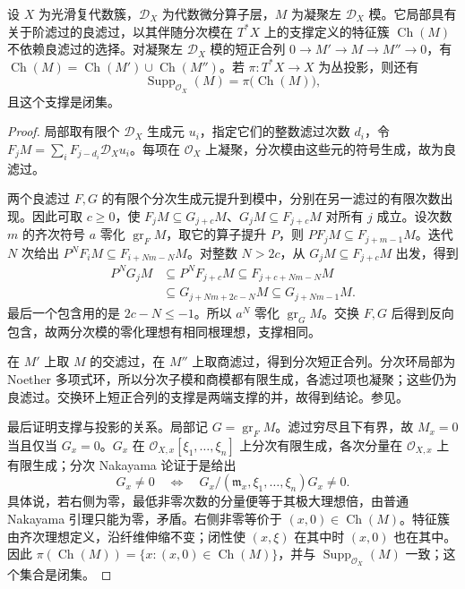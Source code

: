 \begin{proposition}[良滤过与特征簇]\label{b5:prop:D-good-filtration-invariance}
	设 \(X\) 为光滑复代数簇，\(\mathcal D_X\) 为代数微分算子层，\(M\) 为凝聚左 \(\mathcal D_X\) 模。它局部具有关于阶滤过的良滤过，以其伴随分次模在 \(T^*X\) 上的支撑定义的特征簇 \(\operatorname{Ch}(M)\) 不依赖良滤过的选择。对凝聚左 \(\mathcal D_X\) 模的短正合列 \(0\to M'\to M\to M''\to0\)，有 \(\operatorname{Ch}(M)=\operatorname{Ch}(M')\cup\operatorname{Ch}(M'')\)。若 \(\pi:T^*X\to X\) 为丛投影，则还有
	\[
		\operatorname{Supp}_{\mathcal O_X}(M)=\pi\bigl(\operatorname{Ch}(M)\bigr),
	\]
	且这个支撑是闭集。
\end{proposition}
\begin{proof}
	局部取有限个 \(\mathcal D_X\) 生成元 \(u_i\)，指定它们的整数滤过次数 \(d_i\)，令 \(F_jM=\sum_iF_{j-d_i}\mathcal D_Xu_i\)。每项在 \(\mathcal O_X\) 上凝聚，分次模由这些元的符号生成，故为良滤过。

	两个良滤过 \(F,G\) 的有限个分次生成元提升到模中，分别在另一滤过的有限次数出现。因此可取 \(c\ge0\)，使 \(F_jM\subseteq G_{j+c}M\)、\(G_jM\subseteq F_{j+c}M\) 对所有 \(j\) 成立。设次数 \(m\) 的齐次符号 \(a\) 零化 \(\operatorname{gr}_FM\)，取它的算子提升 \(P\)，则 \(PF_jM\subseteq F_{j+m-1}M\)。迭代 \(N\) 次给出 \(P^NF_iM\subseteq F_{i+Nm-N}M\)。对整数 \(N>2c\)，从 \(G_jM\subseteq F_{j+c}M\) 出发，得到
	\[
		\begin{aligned}
			P^NG_jM&\subseteq P^NF_{j+c}M \subseteq F_{j+c+Nm-N}M\\
			&\subseteq G_{j+Nm+2c-N}M \subseteq G_{j+Nm-1}M.
		\end{aligned}
	\]
	最后一个包含用的是 \(2c-N\le-1\)。所以 \(a^N\) 零化 \(\operatorname{gr}_GM\)。交换 \(F,G\) 后得到反向包含，故两分次模的零化理想有相同根理想，支撑相同。

	在 \(M'\) 上取 \(M\) 的交滤过，在 \(M''\) 上取商滤过，得到分次短正合列。分次环局部为 Noether 多项式环，所以分次子模和商模都有限生成，各滤过项也凝聚；这些仍为良滤过。交换环上短正合列的支撑是两端支撑的并，故得到结论。参见\cite[Theorems 2.1.3 and 2.2.1, pp. 58--59]{HottaTakeuchiTanisaki2008DModules}。

	最后证明支撑与投影的关系。局部记 \(G=\operatorname{gr}_FM\)。滤过穷尽且下有界，故 \(M_x=0\) 当且仅当 \(G_x=0\)。\(G_x\) 在 \(\mathcal O_{X,x}[\xi_1,\ldots,\xi_n]\) 上分次有限生成，各次分量在 \(\mathcal O_{X,x}\) 上有限生成；分次 Nakayama 论证于是给出
	\[
		G_x\ne0\quad\Longleftrightarrow\quad G_x/(\mathfrak m_x,\xi_1,\ldots,\xi_n)G_x\ne0.
	\]
	具体说，若右侧为零，最低非零次数的分量便等于其极大理想倍，由普通 Nakayama 引理只能为零，矛盾。右侧非零等价于 \((x,0)\in\operatorname{Ch}(M)\)。特征簇由齐次理想定义，沿纤维伸缩不变；闭性使 \((x,\xi)\) 在其中时 \((x,0)\) 也在其中。因此 \(\pi(\operatorname{Ch}(M))=\{x:(x,0)\in\operatorname{Ch}(M)\}\)，并与 \(\operatorname{Supp}_{\mathcal O_X}(M)\) 一致；这个集合是闭集。
\end{proof}

